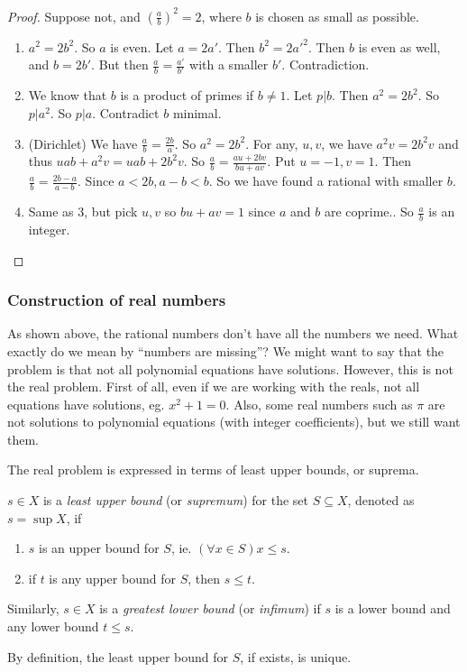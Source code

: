 \documentclass[a4paper]{article}
\begin{document}
\begin{proof}
  Suppose not, and $(\frac{a}{b})^2 = 2$, where $b$ is chosen as small as possible.

  \begin{enumerate}
    \item $a^2 = 2b^2$. So $a$ is even. Let $a = 2a'$. Then $b^2 = 2a'^2$. Then $b$ is even as well, and $b = 2b'$. But then $\frac{a}{b} = \frac{a'}{b'}$ with a smaller $b'$. Contradiction.
    \item We know that $b$ is a product of primes if $b \not= 1$. Let $p | b$. Then $a^2 = 2b^2$. So $p | a^2$. So $p | a$. Contradict $b$ minimal.
    \item (Dirichlet) We have $\frac{a}{b} = \frac{2b}{a}$. So $a^2 = 2b^2$. For any, $u, v$, we have $a^2v = 2b^2v$ and thus $uab + a^2v = uab + 2b^2v$. So $\frac{a}{b} = \frac{au + 2bv}{bu + av}$. Put $u = -1, v = 1$. Then $\frac{a}{b} = \frac{2b - a}{a - b}$. Since $a < 2b, a - b < b$. So we have found a rational with smaller $b$.
    \item Same as 3, but pick $u, v$ so $bu + av = 1$ since $a$ and $b$ are coprime.. So $\frac{a}{b}$ is an integer.
  \end{enumerate}
\end{proof}

\subsubsection*{Construction of real numbers}
As shown above, the rational numbers don't have all the numbers we need. What exactly do we mean by ``numbers are missing''? We might want to say that the problem is that not all polynomial equations have solutions. However, this is not the real problem. First of all, even if we are working with the reals, not all equations have solutions, eg. $x^2 + 1 = 0$. Also, some real numbers such as $\pi$ are not solutions to polynomial equations (with integer coefficients), but we still want them.

The real problem is expressed in terms of least upper bounds, or suprema.

\begin{defi}
  $s\in X$ is a \emph{least upper bound} (or \emph{supremum}) for the set $S\subseteq X$, denoted as $s = \sup X$, if
  \begin{enumerate}
    \item $s$ is an upper bound for $S$, ie. $(\forall x\in S) x \leq s$.
    \item if $t$ is any upper bound for $S$, then $s \leq t$.
  \end{enumerate}

  Similarly, $s\in X$ is a \emph{greatest lower bound} (or \emph{infimum}) if $s$ is a lower bound and any lower bound $t \leq s$.
\end{defi}
By definition, the least upper bound for $S$, if exists, is unique.
\end{document}
